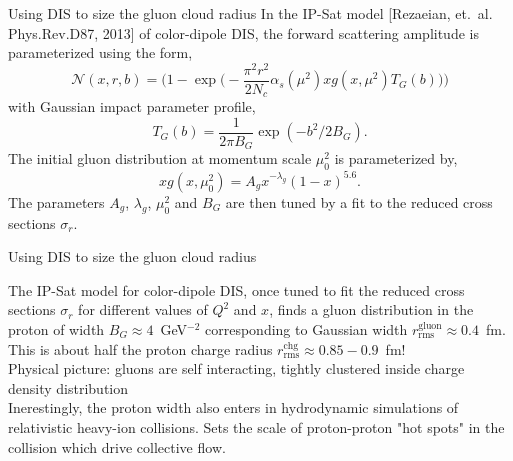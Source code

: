 \documentclass[svgnames]{beamer}
\begin{document}
\begin{frame}{Using DIS to size the gluon cloud radius}
    In the IP-Sat model [Rezaeian, et.\ al.\, Phys.Rev.D87, 2013] of color-dipole DIS, the forward scattering amplitude is parameterized using the form, \\
    \begin{equation*}
    \mathcal{N}(x,r,b) = \Bigg(1 - \exp\Bigg(-\frac{\pi^2 r^2}{2 N_c} \alpha_s(\mu^2) xg(x, \mu^2) T_G(b) \Bigg) \Bigg)
    \end{equation*}
    with Gaussian impact parameter profile,
    \begin{equation*}
        T_G(b) = \frac{1}{2 \pi B_G} \exp(-b^2/2 B_G).
    \end{equation*}
    The initial gluon distribution at momentum scale $\mu_0^2$ is parameterized by, \\
    \begin{equation*}
        x g(x, \mu_0^2) = A_g x^{-\lambda_g} (1 - x)^{5.6}.
    \end{equation*}
    The parameters $A_g$, $\lambda_g$, $\mu_0^2$ and $B_G$ are then tuned by a fit to the reduced cross sections $\sigma_r$.
\end{frame}
\begin{frame}{Using DIS to size the gluon cloud radius}

The IP-Sat model for color-dipole DIS, once tuned to fit the reduced cross sections $\sigma_r$ for different values of $Q^2$ and $x$, finds a gluon distribution in the proton of width $B_G \approx 4$~GeV$^{-2}$ corresponding to Gaussian width $r^\text{gluon}_\text{rms} \approx 0.4$~fm. \bigskip \\

This is about half the proton charge radius $r^\text{chg}_\text{rms} \approx 0.85-0.9$~fm! \bigskip \\

Physical picture: gluons are self interacting, tightly clustered inside charge density distribution \bigskip \\

Inerestingly, the proton width also enters in hydrodynamic simulations of relativistic heavy-ion collisions. Sets the scale of proton-proton "hot spots" in the collision which drive collective flow.  
\end{frame}
\end{document}
